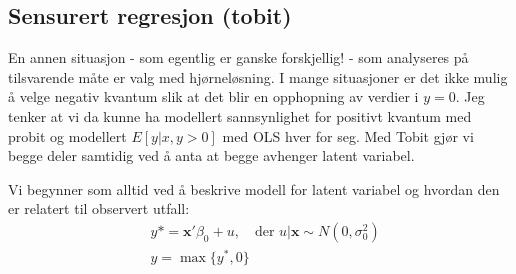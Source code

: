 \subsection{Sensurert regresjon (tobit)}
En annen situasjon - som egentlig er ganske forskjellig! - som analyseres på tilsvarende måte er valg med hjørneløsning. I mange situasjoner er det ikke mulig å velge negativ kvantum slik at det blir en opphopning av verdier i $y=0$. Jeg tenker at vi da kunne ha modellert sannsynlighet for positivt kvantum med probit og modellert $E[y|x,y>0]$ med OLS hver for seg. Med Tobit gjør vi begge deler samtidig ved å anta at begge avhenger latent variabel.

Vi begynner som alltid ved å beskrive modell for latent variabel og hvordan den er relatert til observert utfall:
\begin{align}
&y*=\mathbf{x}'\beta_0+u,\quad \text{der }u|\mathbf{x} \sim N(0,\sigma_0^2) \\
&y=\max\{y^*,0\}
\end{align}

